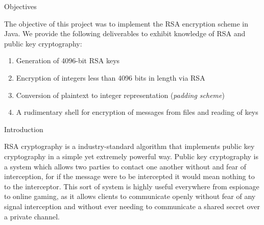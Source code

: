 \documentclass[landscape,fontscale=.4,paperwidth=48in,paperheight=36in]{baposter} %
\newcommand{\compresslist}{ %
\setlength{\itemsep}{1pt}
\setlength{\parskip}{0pt}
\setlength{\parsep}{0pt}
}
\begin{document}
\begin{poster}

\begin{posterbox}[name=objectives,column=0,row=0,span=13]{Objectives}

The objective of this project was to implement the RSA encryption scheme in Java. We provide the following deliverables to exhibit knowledge of RSA and public key cryptography:

\begin{enumerate}\compresslist
\item Generation of 4096-bit RSA keys
\item Encryption of integers less than 4096 bits in length via RSA
\item Conversion of plaintext to integer representation (\emph{padding scheme})
\item A rudimentary shell for encryption of messages from files and reading of keys
\end{enumerate}

\vspace{0.3em} %
\end{posterbox}


\begin{posterbox}[name=intro,column=0,below=objectives, span=13]{Introduction}

RSA cryptography is a industry-standard algorithm that implements public key cryptography in a simple yet extremely powerful way. Public key cryptography is a system which allows two parties to contact one another without and fear of interception, for if the message were to be intercepted it would mean nothing to to the interceptor. This sort of system is highly useful everywhere from espionage to online gaming, as it allows clients to communicate openly without fear of any signal interception and without ever needing to communicate a shared secret over a private channel.


\end{posterbox}
\end{poster}
\end{document}
